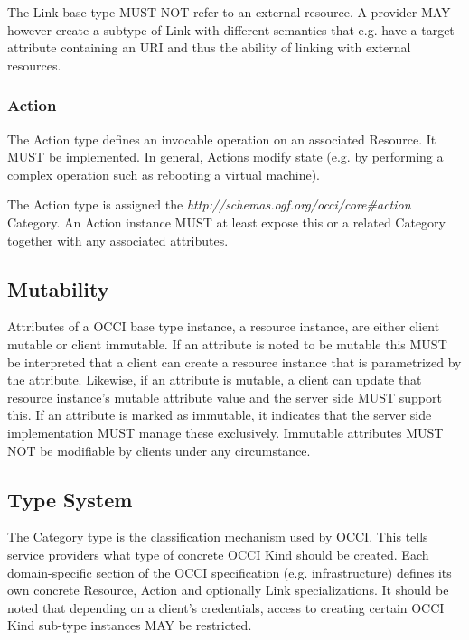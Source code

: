 \documentclass[10pt,a4paper,british]{article}
\begin{document}
The Link base type MUST NOT refer to an external resource. A provider
MAY however create a subtype of Link with different semantics that
e.g. have a target attribute containing an URI and thus the ability of
linking with external resources.

\subsubsection{Action}
The Action type defines an invocable operation on an associated
Resource. It MUST be implemented. In general, Actions modify state
(e.g. by performing a complex operation such as rebooting a virtual
machine).

The Action type is assigned the
\textit{http://schemas.ogf.org/occi/core\#action} Category. An Action
instance MUST at least expose this or a related Category together with
any associated attributes.

\subsection{Mutability}
Attributes of a OCCI base type instance, a resource instance, are
either client mutable or client immutable. If an attribute is noted to
be mutable this MUST be interpreted that a client can create a
resource instance that is parametrized by the attribute. Likewise, if
an attribute is mutable, a client can update that resource instance's
mutable attribute value and the server side MUST support this. If an
attribute is marked as immutable, it indicates that the server side
implementation MUST manage these exclusively. Immutable attributes
MUST NOT be modifiable by clients under any circumstance.

\subsection{Type System}
\label{sec:type_system}
The Category type is the classification mechanism used by OCCI. This
tells service providers what type of concrete OCCI Kind should be
created. Each domain-specific section of the OCCI specification
(e.g. infrastructure) defines its own concrete Resource, Action and
optionally Link specializations. It should be noted that depending on
a client's credentials, access to creating certain OCCI Kind sub-type instances
MAY be restricted.
\end{document}
